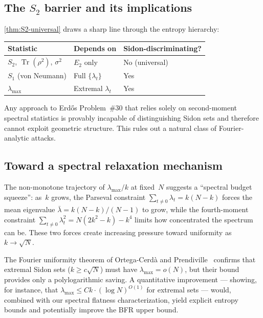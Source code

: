 \documentclass[11pt]{article}
\theoremstyle{definition}
\theoremstyle{remark}
\newcommand{\lmax}{\lambda_{\max}}
\newcommand{\Tr}{\operatorname{Tr}}
\begin{document}
\subsection{The $S_2$ barrier and its implications}

\cref{thm:S2-universal} draws a sharp line through the entropy hierarchy:

\begin{center}
\begin{tabular}{lll}
\toprule
\textbf{Statistic} & \textbf{Depends on} & \textbf{Sidon-discriminating?} \\
\midrule
$S_2$, $\Tr(\rho^2)$, $\sigma^2$ & $E_2$ only & No (universal) \\
$S_1$ (von Neumann) & Full $\{\lambda_t\}$ & Yes \\
$\lmax$ & Extremal $\lambda_t$ & Yes \\
\bottomrule
\end{tabular}
\end{center}

Any approach to Erd\H{o}s Problem~\#30 that relies solely on
second-moment spectral statistics is provably incapable of
distinguishing Sidon sets and therefore cannot exploit geometric
structure.  This rules out a natural class of Fourier-analytic
attacks.

\subsection{Toward a spectral relaxation mechanism}

The non-monotone trajectory of $\lmax/k$ at fixed~$N$ suggests
a ``spectral budget squeeze'': as~$k$ grows, the Parseval
constraint $\sum_{t \ne 0} \lambda_t = k(N-k)$ forces the mean
eigenvalue $\bar\lambda = k(N-k)/(N-1)$ to grow, while the
fourth-moment constraint
$\sum_{t \ne 0} \lambda_t^2 = N(2k^2-k) - k^4$ limits how
concentrated the spectrum can be.  These two forces create
increasing pressure toward uniformity as $k \to \sqrt{N}$.

The Fourier uniformity theorem of Ortega-Cerd\`a and
Prendiville~\cite{OP2021} confirms that extremal Sidon sets
($k \ge c\sqrt{N}$) must have $\lmax = o(N)$, but their bound
provides only a polylogarithmic saving.  A quantitative
improvement --- showing, for instance, that
$\lmax \le C k \cdot (\log N)^{O(1)}$ for extremal sets ---
would, combined with our spectral flatness characterization,
yield explicit entropy bounds and potentially improve the
BFR upper bound.
\end{document}
